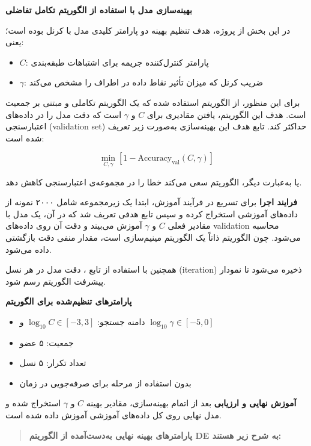 \documentclass{article}
\begin{document}
\textbf{بهینه‌سازی مدل  با استفاده از الگوریتم تکامل تفاضلی}

در این بخش از پروژه، هدف تنظیم بهینه دو پارامتر کلیدی مدل  با کرنل  بوده است؛ یعنی:

\begin{itemize}
	\item $C$: پارامتر کنترل‌کننده جریمه برای اشتباهات طبقه‌بندی
	\item $\gamma$: ضریب کرنل که میزان تأثیر نقاط داده در اطراف را مشخص می‌کند
\end{itemize}

برای این منظور، از الگوریتم  استفاده شده که یک الگوریتم تکاملی و مبتنی بر جمعیت است. هدف این الگوریتم، یافتن مقادیری برای $C$ و $\gamma$ است که دقت مدل را در داده‌های اعتبارسنجی (validation set) حداکثر کند. تابع هدف این بهینه‌سازی به‌صورت زیر تعریف شده است:

\[
\min_{C, \gamma} \left[ 1 - \text{Accuracy}_{\text{val}}(C, \gamma) \right]
\]

یا به‌عبارت دیگر، الگوریتم سعی می‌کند خطا را در مجموعه‌ی اعتبارسنجی کاهش دهد.

\vspace{1em}
\textbf{فرایند اجرا}
برای تسریع در فرآیند آموزش، ابتدا یک زیرمجموعه شامل ۲۰۰۰ نمونه از داده‌های آموزشی استخراج کرده و سپس تابع هدفی تعریف شد که در آن، یک مدل  با مقادیر فعلی $C$ و $\gamma$ آموزش می‌بیند و دقت آن روی داده‌های validation محاسبه می‌شود. چون الگوریتم  ذاتاً یک الگوریتم مینیم‌سازی است، مقدار منفی دقت بازگشتی داده می‌شود.

همچنین با استفاده از تابع ، دقت مدل در هر نسل (iteration) ذخیره می‌شود تا نمودار پیشرفت الگوریتم رسم شود.

\vspace{1em}
\textbf{پارامترهای تنظیم‌شده برای الگوریتم }
\begin{itemize}
	\item دامنه جستجو: $\log_{10} C \in [-3, 3]$ و $\log_{10} \gamma \in [-5, 0]$
	\item جمعیت: ۵ عضو
	\item تعداد تکرار: ۵ نسل
	\item بدون استفاده از مرحله  برای صرفه‌جویی در زمان
\end{itemize}

\vspace{1em}
\textbf{آموزش نهایی و ارزیابی}
بعد از اتمام بهینه‌سازی، مقادیر بهینه $C$ و $\gamma$ استخراج شده و مدل نهایی روی کل داده‌های آموزشی آموزش داده شده است. 
\begin{quote}
	\textbf{پارامترهای بهینه نهایی به‌دست‌آمده از الگوریتم DE به شرح زیر هستند:}
	
	\vspace{0.5em}
	 \hspace{2em} 
\end{quote}
\end{document}

